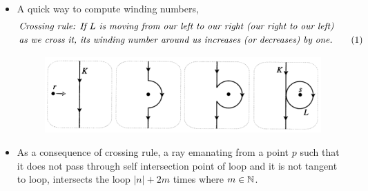 \documentclass[12pt]{article}
\newcommand\numberthis{\addtocounter{equation}{1}\tag{\theequation}}
\def\tt{\textit}
\def\mb{\ensuremath\mathbb}
\def\N{\ensuremath\mb{N}}
\begin{document}
\begin{itemize}
\begin{figure}[h!]
        \label{f1}
    \end{figure}
    \item A quick way to compute winding numbers, 
    \begin{align*}
        &\tt{Crossing rule: If $L$ is moving from our left to our right (our right to our left)}\\
        &\tt{as we cross it, its winding number around us increases (or decreases) by one.} \numberthis \label{e1}
    \end{align*}

    \begin{figure}[h!]
        \centering
        \includegraphics[scale=0.7]{fig_8}
        \label{f8}
    \end{figure}

    \item As a consequence of crossing rule, a ray emanating from a point $p$ such that it does not pass through self intersection point of loop and it is not tangent to loop, intersects the loop $|n| + 2m$ times where $m \in \N$.
\end{itemize}
\end{document}
